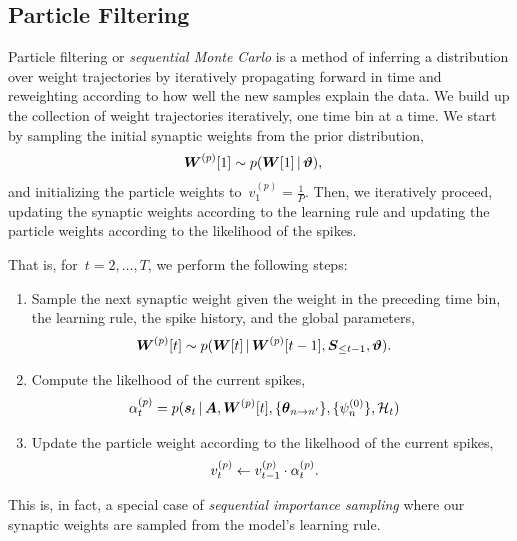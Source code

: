 \subsection{Particle Filtering}
Particle filtering \cite{andrieu2003introduction} or \emph{sequential
  Monte Carlo} is a method of inferring a distribution over weight
trajectories by iteratively propagating forward in time and
reweighting according to how well the new samples explain the data.
We build up the collection of weight trajectories iteratively, one
time bin at a time. We start by sampling the initial synaptic weights
from the prior distribution,
\begin{align*}
  \boldsymbol{W}^{(p)}[1] &\sim p(\boldsymbol{W}[1] \,|\, \boldsymbol{\vartheta}),
\end{align*}
and initializing the particle weights to~${v_1^{(p)} = \frac{1}{P}}$.
Then, we iteratively proceed, updating the synaptic weights according to the 
learning rule and updating the particle weights according to the likelihood 
of the spikes. 

That is, for~${t=2, \ldots, T}$, we perform the following steps:
\begin{enumerate}
\item Sample the next synaptic weight given the weight in the
  preceding time bin, the learning rule, the spike history, and the
  global parameters,
  \begin{align*}
    \boldsymbol{W}^{(p)}[t] &\sim p(\boldsymbol{W}[t] \,|\, \boldsymbol{W}^{(p)}[t-1], \boldsymbol{S}_{\leq t-1}, \boldsymbol{\vartheta}).
  \end{align*}

\item Compute the likelhood of the current spikes,
  \begin{align*}
    \alpha_t^{(p)} &= p(\boldsymbol{s}_t \,|\, \boldsymbol{A}, \boldsymbol{W}^{(p)}[t], \{\boldsymbol{\theta}_{n \to n'}\}, \{\psi_n^{(0)}\}, \mathcal{H}_t )
  \end{align*}
\item Update the particle weight according to the likelhood of the current spikes,
  \begin{align*}
    v_t^{(p)} &\leftarrow v_{t-1}^{(p)} \cdot \alpha_t^{(p)}.
  \end{align*}
\end{enumerate}
This is, in fact, a special case of \emph{sequential importance sampling} where
our synaptic weights are sampled from the model's learning rule.

